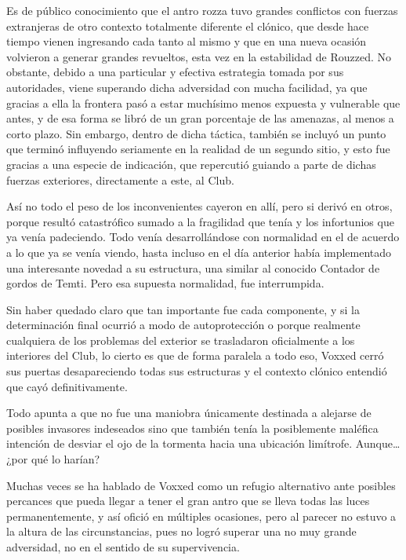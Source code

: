 \documentclass[
  spanish,
]{book}
\begin{document}
Es de público conocimiento que el antro rozza tuvo grandes conflictos con fuerzas extranjeras de otro contexto totalmente diferente el clónico, que desde hace tiempo vienen ingresando cada tanto al mismo y que en una nueva ocasión volvieron a generar grandes revueltos, esta vez en la estabilidad de Rouzzed. No obstante, debido a una particular y efectiva estrategia tomada por sus autoridades, viene superando dicha adversidad con mucha facilidad, ya que gracias a ella la frontera pasó a estar muchísimo menos expuesta y vulnerable que antes, y de esa forma se libró de un gran porcentaje de las amenazas, al menos a corto plazo. Sin embargo, dentro de dicha táctica, también se incluyó un punto que terminó influyendo seriamente en la realidad de un segundo sitio, y esto fue gracias a una especie de indicación, que repercutió guiando a parte de dichas fuerzas exteriores, directamente a este, al Club.

Así no todo el peso de los inconvenientes cayeron en allí, pero si derivó en otros, porque resultó catastrófico sumado a la fragilidad que tenía y los infortunios que ya venía padeciendo. Todo venía desarrollándose con normalidad en el de acuerdo a lo que ya se venía viendo, hasta incluso en el día anterior había implementado una interesante novedad a su estructura, una similar al conocido Contador de gordos de Temti. Pero esa supuesta normalidad, fue interrumpida.

Sin haber quedado claro que tan importante fue cada componente, y si la determinación final ocurrió a modo de autoprotección o porque realmente cualquiera de los problemas del exterior se trasladaron oficialmente a los interiores del Club, lo cierto es que de forma paralela a todo eso, Voxxed cerró sus puertas desapareciendo todas sus estructuras y el contexto clónico entendió que cayó definitivamente.

Todo apunta a que no fue una maniobra únicamente destinada a alejarse de posibles invasores indeseados sino que también tenía la posiblemente maléfica intención de desviar el ojo de la tormenta hacia una ubicación limítrofe. Aunque\ldots{} ¿por qué lo harían?

Muchas veces se ha hablado de Voxxed como un refugio alternativo ante posibles percances que pueda llegar a tener el gran antro que se lleva todas las luces permanentemente, y así ofició en múltiples ocasiones, pero al parecer no estuvo a la altura de las circunstancias, pues no logró superar una no muy grande adversidad, no en el sentido de su supervivencia.
\end{document}
